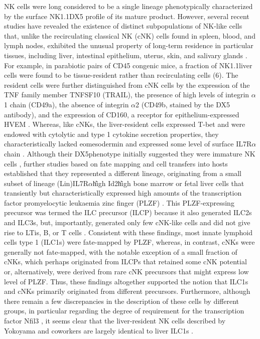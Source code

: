 NK cells were long considered to be a single lineage phenotypically characterized by the surface \CDte\UM NK1.1\UP DX5\UP{} profile of its mature product. However, several recent studies have revealed the existence of distinct subpopulations of NK-like cells that, unlike the recirculating classical NK (cNK) cells found in spleen, blood, and lymph nodes, exhibited the unusual property of long-term residence in particular tissues, including liver, intestinal epithelium, uterus, skin, and salivary glands \cite{sojka2014,yokoyama2013,peng2013,cortez2014, fuchs2013,sojka2014review}. For example, in parabiotic pairs of CD45\UM{} congenic mice, a fraction of \CDte\UM NK1.1\UP liver cells were found to be tissue-resident rather than recirculating cells (6). The resident cells were further distinguished from cNK cells by the expression of the TNF family member TNFSF10 (TRAIL), the presence of high levels of integrin $\alpha$1 chain (CD49a), the absence of integrin $\alpha$2 (CD49b, stained by the DX5 antibody), and the expression of CD160, a receptor for epithelium-expressed HVEM \cite{sojka2014,peng2013,fuchs2013,klose2014}. Whereas, like cNKs, the liver-resident cells expressed T-bet and were endowed with cytolytic and type 1 cytokine secretion properties, they characteristically lacked eomesodermin and expressed some level of surface IL7R$\alpha$ chain \cite{sojka2014,klose2014,daussy2014}. Although their DX5\UM phenotype initially suggested they were immature NK cells \cite{takeda2005,gordon2012,vosshenrich2013}, further studies based on fate mapping and cell transfers into \Ragrg hosts established that they represented a different lineage, originating from a small subset of lineage (Lin)\UM IL7R$\alpha$\UP \ab\U{high} Id2\U{high} bone marrow or fetal liver cells that transiently but characteristically expressed high amounts of the transcription factor promyelocytic leukaemia zinc finger (PLZF) \cite{klose2014,constantinides2014}. This PLZF-expressing precursor was termed the ILC precursor (ILCP) because it also generated ILC2s and ILC3s, but, importantly, generated only few cNK-like cells and did not give rise to LTis, B, or T cells \cite{constantinides2014}. Consistent with these findings, most innate lymphoid cells type 1 (ILC1s) were fate-mapped by PLZF, whereas, in contrast, cNKs were generally not fate-mapped, with the notable exception of a small fraction of cNKs, which perhaps originated from ILCPs that retained some cNK potential or, alternatively, were derived from rare cNK precursors that might express low level of PLZF. Thus, these findings altogether supported the notion that ILC1s and cNKs primarily originated from different precursors. Furthermore, although there remain a few discrepancies in the description of these cells by different groups, in particular regarding the degree of requirement for the transcription factor Nfil3 \cite{sojka2014,yu2014}, it seems clear that the liver-resident NK cells described by Yokoyama and coworkers are largely identical to liver ILC1s \cite{sojka2014}.


